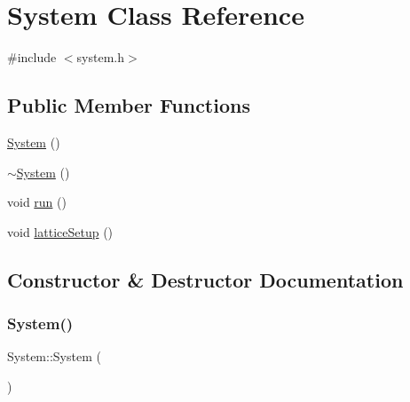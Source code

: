 \hypertarget{class_system}{}\section{System Class Reference}
\label{class_system}


{\ttfamily \#include $<$system.\+h$>$}

\subsection*{Public Member Functions}
\begin{DoxyCompactItemize}
\item 
\mbox{\hyperlink{class_system_ae317936c9bcf1374d61745572e0f2f8a}{System}} ()
\item 
\mbox{\hyperlink{class_system_a3be70bb338e3f062f821173fd15680d0}{$\sim$\+System}} ()
\item 
void \mbox{\hyperlink{class_system_afa39feb75f96798930f4bfb48205f40b}{run}} ()
\item 
void \mbox{\hyperlink{class_system_a93c8a8258ac8f6382ec393bca1271011}{lattice\+Setup}} ()
\end{DoxyCompactItemize}


\subsection{Constructor \& Destructor Documentation}
\mbox{\label{class_system_ae317936c9bcf1374d61745572e0f2f8a}} 
\subsubsection{\texorpdfstring{System()}{System()}}
{\footnotesize\ttfamily System\+::\+System (\begin{DoxyParamCaption}{ }\end{DoxyParamCaption})}

